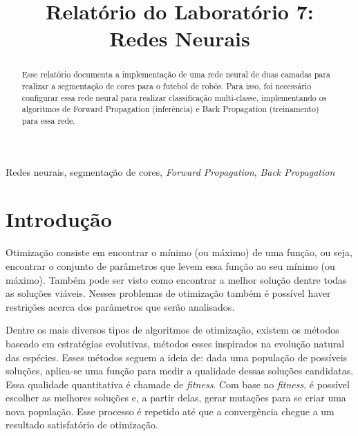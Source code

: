 \documentclass[conference]{IEEEtran}
\begin{document}
\title{Relatório do Laboratório 7: \\ Redes Neurais\\
}

\author{
}

\maketitle

\begin{abstract}
Esse relatório documenta a implementação de uma rede neural de duas camadas para realizar a segmentação de cores para o futebol de robôs. Para isso, foi necessário configurar essa rede neural para realizar classificação multi-classe, implementando os algoritmos de Forward Propagation (inferência) e Back Propagation (treinamento) para essa rede.
\end{abstract}

\begin{IEEEkeywords}
Redes neurais, segmentação de cores, \textit{Forward Propagation}, \textit{Back Propagation}
\end{IEEEkeywords}

\section{Introdução}
Otimização consiste em encontrar o mínimo (ou máximo) de uma função, ou seja, encontrar o conjunto de parâmetros que levem essa função ao seu mínimo (ou máximo). Também pode ser visto como encontrar a melhor solução dentre todas as soluções viáveis. Nesses problemas de otimização também é possível haver restrições acerca dos parâmetros que serão analisados.

Dentre os mais diversos tipos de algoritmos de otimização, existem os métodos baseado em estratégias evolutivas, métodos esses inspirados na evolução natural das espécies. Esses métodos seguem a ideia de: dada uma população de possíveis soluções, aplica-se uma função para medir a qualidade dessas soluções candidatas. Essa qualidade quantitativa é chamade de \textit{fitness}. Com base no \textit{fitness}, é possível escolher as melhores soluções e, a partir delas, gerar mutações para se criar uma nova população. Esse processo é repetido até que a convergência chegue a um resultado satisfatório de otimização.
\end{document}

